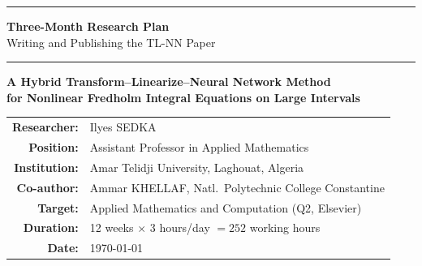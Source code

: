 \documentclass[12pt,a4paper]{article}
\begin{document}
\onehalfspacing

\begin{titlepage}
\begin{center}

\vspace*{1.5cm}
{\color{darkblue}\rule{\linewidth}{2pt}}
\vspace{0.5cm}

{\Huge\bfseries\color{darkblue} Three-Month Research Plan}\\[0.6em]
{\Large\color{midblue} Writing and Publishing the TL-NN Paper}

\vspace{0.5cm}
{\color{midblue}\rule{\linewidth}{1pt}}
\vspace{1.2cm}

\begin{tcolorbox}[infostyle]
\begin{center}
{\large\bfseries\color{darkblue}
A Hybrid Transform--Linearize--Neural Network Method\\[4pt]
for Nonlinear Fredholm Integral Equations on Large Intervals}
\end{center}
\end{tcolorbox}

\vspace{1.5cm}

\begin{tabular}{rl}
\textbf{\color{darkgray}Researcher:}    & Ilyes SEDKA \\[4pt]
\textbf{\color{darkgray}Position:}      & Assistant Professor in Applied Mathematics \\[4pt]
\textbf{\color{darkgray}Institution:}   & Amar Telidji University, Laghouat, Algeria \\[4pt]
\textbf{\color{darkgray}Co-author:}     & Ammar KHELLAF, Natl.\ Polytechnic College Constantine \\[4pt]
\textbf{\color{darkgray}Target:}        & Applied Mathematics and Computation (Q2, Elsevier) \\[4pt]
\textbf{\color{darkgray}Duration:}      & 12 weeks $\times$ 3 hours/day $= 252$ working hours \\[4pt]
\textbf{\color{darkgray}Date:}          & \today \\
\end{tabular}


\end{center}
\end{titlepage}
\end{document}
